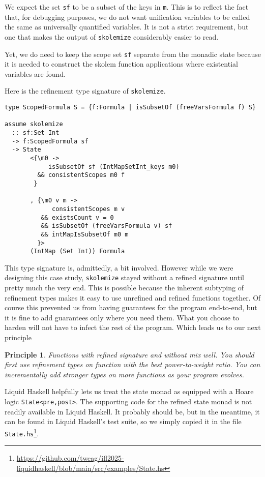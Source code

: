 \documentclass[sigconf]{acmart}
\newcommand{\tc}[1]{{\small\texttt{#1}}}
\newcommand{\sourcefile}[1]{\tc{#1}\footnote{\scriptsize\url{https://github.com/tweag/ifl2025-liquidhaskell/blob/main/src/examples/#1}}}
\newtheorem{principle}{Principle}
\begin{document}
We expect the set \tc{sf} to be a subset of the keys in \tc{m}. This is to reflect the
fact that, for debugging purposes, we do not want unification variables to be called the same as
universally quantified variables. It is not a strict requirement, but one
that makes the output of \tc{skolemize} considerably easier to read.

Yet, we do need to keep the scope set \tc{sf} separate from the monadic
state because it is needed to construct the skolem function applications where
existential variables are found.

Here is the refinement type signature of \tc{skolemize}.
\begin{verbatim}
type ScopedFormula S = {f:Formula | isSubsetOf (freeVarsFormula f) S}

assume skolemize
  :: sf:Set Int
  -> f:ScopedFormula sf
  -> State
       <{\m0 ->
            isSubsetOf sf (IntMapSetInt_keys m0)
         && consistentScopes m0 f
        }

       , {\m0 v m ->
             consistentScopes m v
          && existsCount v = 0
          && isSubsetOf (freeVarsFormula v) sf
          && intMapIsSubsetOf m0 m
         }>
       (IntMap (Set Int)) Formula
\end{verbatim}

This type signature is, admittedly, a bit involved. However while we were
designing this case study, \tc{skolemize} stayed without a refined signature
until pretty much the very end. This is possible because the inherent subtyping
of refinement types makes it easy to use unrefined and refined functions together.
Of course this prevented us from having guarantees for the program end-to-end,
but it is fine to add guarantees only where you need them. What you choose
to harden will not have to infect the rest of the program.
Which leads us to our next principle

\begin{principle}
  Functions with refined signature and without mix well. You should first use
  refinement types on function with the best power-to-weight ratio. You can
  incrementally add stronger types on more functions as your program evolves.
\end{principle}

Liquid Haskell helpfully lets us treat the state monad as equipped with
a Hoare logic \tc{State<pre,post>}. The supporting code for the refined state
monad is not readily available in Liquid Haskell. It probably should be, but in
the meantime, it can be found in Liquid Haskell's test suite, so we simply
copied it in the file \sourcefile{State.hs}.
\end{document}
